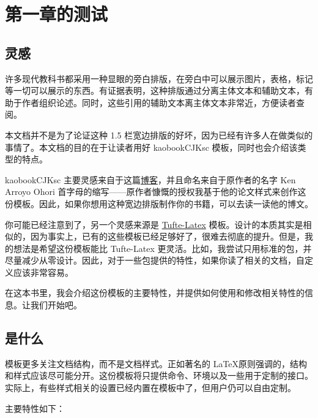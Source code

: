 \setchapterpreamble[u]{\margintoc}
\chapter{第一章的测试}



\section{灵感}

许多现代教科书都采用一种显眼的旁白排版，在旁白中可以展示图片，表格，标记等一切可以展示的东西。有证据表明，这种排版通过分离主体文本和辅助文本，有助于作者组织论述。同时，这些引用的辅助文本离主体文本非常近，方便读者查阅。

本文档并不是为了论证这种 1.5 栏宽边排版的好坏，因为已经有许多人在做类似的事情了。本文档的目的在于让读者用好 kaobookCJKsc 模板，同时也会介绍该类型的特点。

kaobookCJKsc 主要灵感来自于这篇\href{https://3d.bk.tudelft.nl/ken/en/2016/04/17/a-1.5-column-layout-in-latex.html}{博客}，并且命名来自于原作者的名字 Ken Arroyo Ohori 首字母的缩写——原作者慷慨的授权我基于他的论文样式来创作这份模板。因此，如果你想用这种宽边排版制作你的书籍，可以去读一读他的博文。

你可能已经注意到了，另一个灵感来源是 \href{https://github.com/Tufte-LaTeX/tufte-latex}{Tufte-Latex} 模板。设计的本质其实是相似的，因为事实上，已有的这些模板已经足够好了，很难去彻底的提升。但是，我的想法是希望这份模板能比 Tufte-Latex 更灵活。比如，我尝试只用标准的包，并尽量减少从零设计。因此，对于一些包提供的特性，如果你读了相关的文档，自定义应该非常容易。

在这本书里，我会介绍这份模板的主要特性，并提供如何使用和修改相关特性的信息。让我们开始吧。

\section{是什么}

 模板更多关注文档结构，而不是文档样式。正如著名的 \LaTeX 原则强调的，结构和样式应该尽可能分开。这份模板将只提供命令、环境以及一些用于定制的接口。实际上，有些样式相关的设置已经内置在模板中了，但用户仍可以自由定制。

\noindent 主要特性如下：

